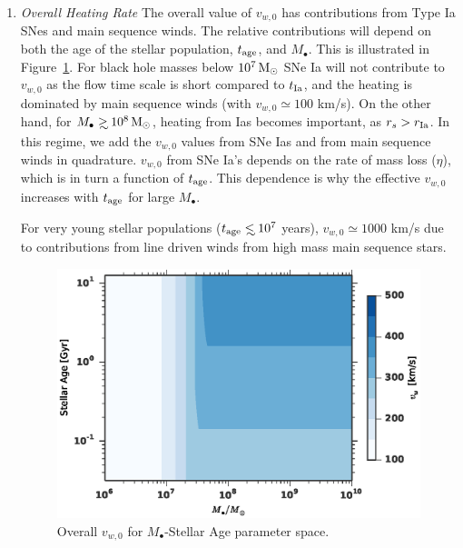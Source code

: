 \documentclass[usenatbib,fleqn]{mn2e}
\newcommand\lsim{\mathrel{\rlap{\lower4pt\hbox{\hskip1pt$\sim$}}
    \raise1pt\hbox{$<$}}}
\newcommand\gsim{\mathrel{\rlap{\lower4pt\hbox{\hskip1pt$\sim$}}
    \raise1pt\hbox{$>$}}}
\newcommand{\rs}{r_s}
\newcommand{\Mbh}[1][]{M_{\bullet#1}}
\newcommand{\rIa}{r_{\rm Ia}}
\newcommand{\vwO}{v_{w,0}}
\newcommand{\tage}{t_{\rm age}}
\begin{document}
\begin{enumerate}
\item \emph{Overall Heating Rate} The overall value of $\vwO$ has
  contributions from Type Ia SNes and main sequence winds.  The
  relative contributions will depend on both the age of the stellar
  population, $\tage$, and $\Mbh$.  This is illustrated in
  Figure~\ref{fig:vweff}. For black hole masses below $10^7 \,{\rm M_\odot}$ SNe
  Ia will not contribute to $\vwO$ as the flow time scale is short
  compared to $t_{\rm Ia}$, and the heating is dominated by main
  sequence winds (with $\vwO\simeq 100$ km/s).  On the other hand, for
  $\Mbh \gsim 10^8 \Msun$, heating from Ias becomes important, as
  $\rs>\rIa$.  In this regime, we add the $\vwO$ values from SNe Ias
  and from main sequence winds in quadrature. $\vwO$ from SNe Ia's
  depends on the rate of mass loss ($\eta$), which is in turn a
  function of $t_{\rm age}$. This dependence is why the effective
  $\vwO$ increases with $\tage$ for large $\Mbh$.

  For very young stellar populations ($\tage \lsim 10^7$ years),
  $\vwO\simeq 1000$ km/s due to contributions from line driven winds
  from high mass main sequence stars.

  \begin{figure}
    \includegraphics[width=\columnwidth]{vw-contour.eps}
    \caption{\label{fig:vweff} Overall $\vwO$ for $\Mbh$-Stellar Age parameter space.}
  \end{figure}

\end{enumerate}
\end{document}
